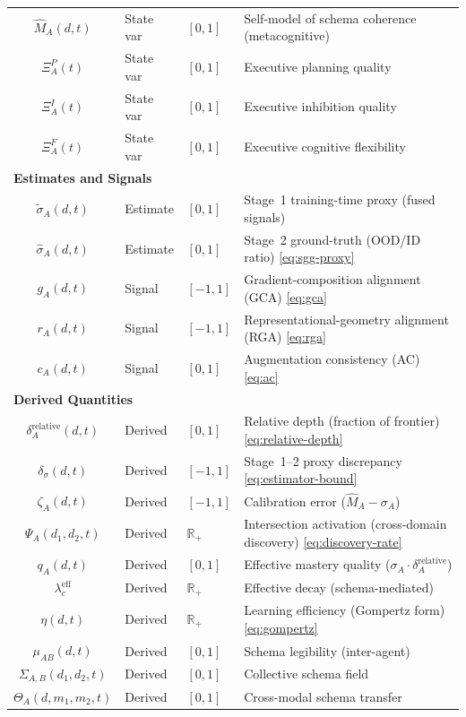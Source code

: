 \documentclass[10pt]{article}
\newcommand{\R}{\mathbb{R}}
\begin{document}
\begin{center}
\begin{tabular}{c l l l}
$\hat{M}_A(d,t)$ & State var & $[0,1]$ & Self-model of schema coherence (metacognitive) \\
$\Xi_A^P(t)$ & State var & $[0,1]$ & Executive planning quality \\
$\Xi_A^I(t)$ & State var & $[0,1]$ & Executive inhibition quality \\
$\Xi_A^F(t)$ & State var & $[0,1]$ & Executive cognitive flexibility \\
\multicolumn{4}{l}{\textbf{Estimates and Signals}} \\
$\tilde{\sigma}_A(d,t)$ & Estimate & $[0,1]$ & Stage~1 training-time proxy (fused signals) \\
$\hat{\sigma}_A(d,t)$ & Estimate & $[0,1]$ & Stage~2 ground-truth (OOD/ID ratio) \hfill\eqref{eq:sgg-proxy} \\
$g_A(d,t)$ & Signal & $[-1,1]$ & Gradient-composition alignment (GCA) \hfill\eqref{eq:gca} \\
$r_A(d,t)$ & Signal & $[-1,1]$ & Representational-geometry alignment (RGA) \hfill\eqref{eq:rga} \\
$c_A(d,t)$ & Signal & $[0,1]$ & Augmentation consistency (AC) \hfill\eqref{eq:ac} \\
\multicolumn{4}{l}{\textbf{Derived Quantities}} \\
$\delta_A^{\text{relative}}(d,t)$ & Derived & $[0,1]$ & Relative depth (fraction of frontier) \hfill\eqref{eq:relative-depth} \\
$\delta_\sigma(d,t)$ & Derived & $[-1,1]$ & Stage~1--2 proxy discrepancy \hfill\eqref{eq:estimator-bound} \\
$\zeta_A(d,t)$ & Derived & $[-1,1]$ & Calibration error ($\hat{M}_A - \sigma_A$) \\
$\Psi_A(d_1,d_2,t)$ & Derived & $\R_+$ & Intersection activation (cross-domain discovery) \hfill\eqref{eq:discovery-rate} \\
$q_A(d,t)$ & Derived & $[0,1]$ & Effective mastery quality ($\sigma_A \cdot \delta_A^{\text{relative}}$) \\
$\lambda_c^{\text{eff}}$ & Derived & $\R_+$ & Effective decay (schema-mediated) \\
$\eta(d,t)$ & Derived & $\R_+$ & Learning efficiency (Gompertz form) \hfill\eqref{eq:gompertz} \\
$\mu_{AB}(d,t)$ & Derived & $[0,1]$ & Schema legibility (inter-agent) \\
$\Sigma_{A,B}(d_1,d_2,t)$ & Derived & $[0,1]$ & Collective schema field \\
$\Theta_A(d,m_1,m_2,t)$ & Derived & $[0,1]$ & Cross-modal schema transfer \\

\end{tabular}
\end{center}
\end{document}
